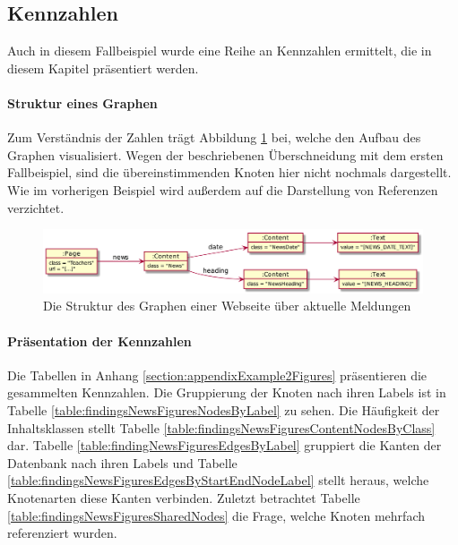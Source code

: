 \subsection{Kennzahlen}
    Auch in diesem Fallbeispiel wurde eine Reihe an Kennzahlen ermittelt,
    die in diesem Kapitel präsentiert werden.

    \paragraph{Struktur eines Graphen}
    Zum Verständnis der Zahlen trägt Abbildung \ref{image:findingNewsFiguresDbModel} bei,
    welche den Aufbau des Graphen visualisiert.
    Wegen der beschriebenen Überschneidung mit dem ersten Fallbeispiel,
    sind die übereinstimmenden Knoten hier nicht nochmals dargestellt.
    Wie im vorherigen Beispiel wird außerdem auf die Darstellung von
    Referenzen verzichtet.

    \begin{figure}[htb]
        \centering
        \includegraphics[scale=\imageScalingFactor]{../resources/findings/case-study-2/dbmodel.png}
        \caption{Die Struktur des Graphen einer Webseite über aktuelle Meldungen}
        \label{image:findingNewsFiguresDbModel}
    \end{figure}

    \paragraph{Präsentation der Kennzahlen}
    Die Tabellen in Anhang \ref{section:appendixExample2Figures} präsentieren die gesammelten Kennzahlen.
    Die Gruppierung der Knoten nach ihren Labels ist in Tabelle
    \ref{table:findingsNewsFiguresNodesByLabel} zu sehen.
    Die Häufigkeit der Inhaltsklassen stellt Tabelle
    \ref{table:findingsNewsFiguresContentNodesByClass} dar.
    Tabelle \ref{table:findingNewsFiguresEdgesByLabel} gruppiert die Kanten der Datenbank
    nach ihren Labels und Tabelle
    \ref{table:findingsNewsFiguresEdgesByStartEndNodeLabel}
    stellt heraus, welche Knotenarten diese Kanten verbinden.
    Zuletzt betrachtet Tabelle \ref{table:findingsNewsFiguresSharedNodes}
    die Frage, welche Knoten mehrfach referenziert wurden.
